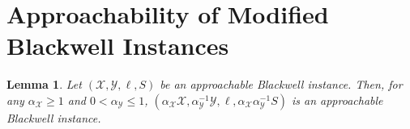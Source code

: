 \documentclass[a4paper,12pt]{article}
\newtheorem{lemma} {Lemma}
\newcommand{\mY}{\mathcal{Y}}
\newcommand{\mX}{\mathcal{X}}
\newcommand{\mB}{\mathcal{B}}
\begin{document}

\section{Approachability  of Modified Blackwell Instances}
\begin{lemma}\label{lemma: alphaS app}
Let $(\mX,\mY ,\ell ,S)$ be an approachable Blackwell instance.%
Then, for any $\alpha_{\mX} \geq 1$ and  $0 < \alpha_{\mY}  \leq 1$, $(\alpha_{\mX}\mX,\alpha_{\mY}^{-1}\mY ,\ell ,\alpha_{\mX}\alpha_{\mY}^{-1}S)$ is an approachable Blackwell instance.
\end{lemma}
\end{document}
